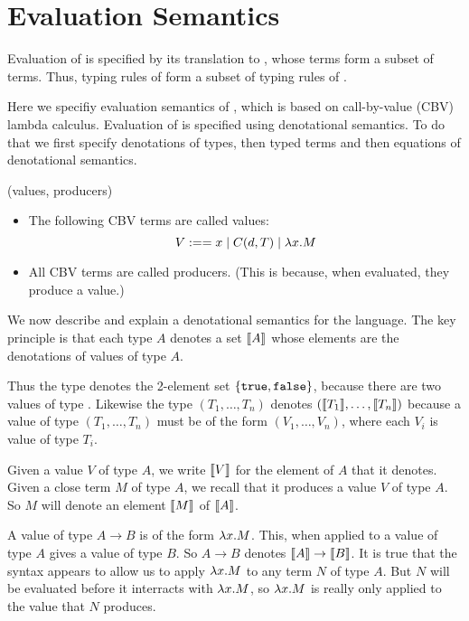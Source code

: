 \section{Evaluation Semantics}
\label{sec:evaluation}

  Evaluation of \langname is specified by its translation to \corelang, whose
terms form a subset of \langname terms. Thus, typing rules of \corelang form
a subset of typing rules of \langname.

Here we specifiy evaluation semantics of \corelang, which is based on
call-by-value (CBV) lambda calculus. Evaluation of \corelang is specified
using denotational semantics. To do that we first specify denotations of
types, then typed terms and then equations of denotational semantics.

\begin{definition}
  (values, producers)
  \begin{itemize}
    \item The following CBV terms are called values:
    $$ V :== x \mid C(d, T) \mid \lambda x.M$$
    \item All CBV terms are called producers. (This is because, when evaluated, they produce a value.)
  \end{itemize}
\end{definition}

We now describe and explain a denotational semantics for the \corelang
language. The key principle is that each type $A$ denotes a set $\llbracket A\rrbracket$
whose elements are the denotations of values of type $A$.

Thus the type  denotes the 2-element set
$\{\lst{true},\lst{false}\}$, because there are two values of type
. Likewise the type $(T_1,\dots,T_n)$ denotes
$(\llbracket T_1\rrbracket,\dots,\llbracket T_n\rrbracket)$ because a value of type $(T_1,\dots,T_n)$
must be of the form $(V_1,\dots,V_n)$, where each $V_i$ is value of type
$T_i$.

Given a value $V$ of type $A$, we write $\llbracket V\rrbracket$ for the element of $A$
that it denotes. Given a close term $M$ of type $A$, we recall that it
produces a value $V$ of type $A$. So $M$ will denote an element $\llbracket M\rrbracket$
of $\llbracket A\rrbracket$.

A value of type $A \to B$ is of the form $\lambda x.M$. This, when
applied to a value of type $A$ gives a value of type $B$. So $A \to B$
denotes $\llbracket A\rrbracket \to \llbracket B\rrbracket$. It is true that the syntax appears to
allow us to apply $\lambda x.M$ to any term $N$ of type $A$. But $N$ will be
evaluated before it interracts with $\lambda x.M$, so $\lambda x.M$ is really only applied to the value that $N$ produces.

